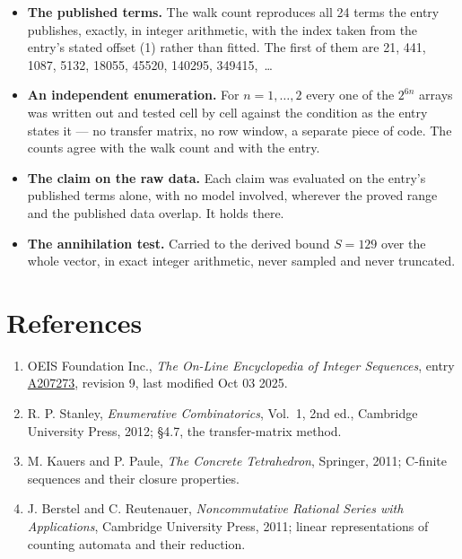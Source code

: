 \documentclass[11pt]{article}
\theoremstyle{definition}
\begin{document}
\begin{itemize}

\item {\bfseries The published terms.} The walk count reproduces all 24 terms the entry publishes, exactly, in integer arithmetic, with the index taken from the entry's stated offset (1) rather than fitted. The first of them are 21, 441, 1087, 5132, 18055, 45520, 140295, 349415,~\dots

\item {\bfseries An independent enumeration.} For $n = 1,\dots,2$ every one of the $2^{6n}$ arrays was written out and tested cell by cell against the condition as the entry states it --- no transfer matrix, no row window, a separate piece of code. The counts agree with the walk count and with the entry.

\item {\bfseries The claim on the raw data.} Each claim was evaluated on the entry's published terms alone, with no model involved, wherever the proved range and the published data overlap. It holds there.

\item {\bfseries The annihilation test.} Carried to the derived bound $S = 129$ over the whole vector, in exact integer arithmetic, never sampled and never truncated.

\end{itemize}

\section{References}

\begin{enumerate}

\item OEIS Foundation Inc., \emph{The On-Line Encyclopedia of Integer Sequences}, entry \href{https://oeis.org/A207273}{A207273}, revision 9, last modified Oct 03 2025.

\item R. P. Stanley, \emph{Enumerative Combinatorics}, Vol.~1, 2nd ed., Cambridge University Press, 2012; \S4.7, the transfer-matrix method.

\item M. Kauers and P. Paule, \emph{The Concrete Tetrahedron}, Springer, 2011; C-finite sequences and their closure properties.

\item J. Berstel and C. Reutenauer, \emph{Noncommutative Rational Series with Applications}, Cambridge University Press, 2011; linear representations of counting automata and their reduction.

\end{enumerate}
\end{document}
